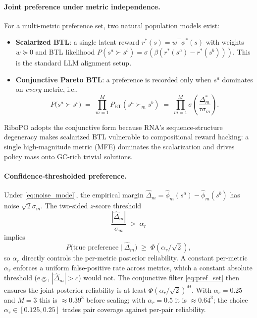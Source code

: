 {{\paragraph{Joint preference under metric independence.}
For a multi-metric preference set, two natural population models exist:
\begin{itemize}[leftmargin=1.2em,itemsep=2pt,topsep=2pt]
\item \textbf{Scalarized BTL}: a single latent reward $r^*(s) = w^\top \phi^*(s)$ with weights $w \succeq 0$ and BTL likelihood $P(s^a \succ s^b) = \sigma(\beta(r^*(s^a) - r^*(s^b)))$. This is the standard LLM alignment setup.
\item \textbf{Conjunctive Pareto BTL}: a preference is recorded only when $s^a$ dominates on \emph{every} metric, i.e.,
\begin{equation}
P\big(s^a \succ s^b\big) \;=\; \prod_{m=1}^M P_{\text{BT}}(s^a \succ_m s^b)
\;=\; \prod_{m=1}^M \sigma\!\left(\frac{\Delta_m^*}{\tau\sigma_m}\right).
\label{eq:conjunctive_bt}
\end{equation}
\end{itemize}
RiboPO adopts the conjunctive form because RNA's sequence-structure degeneracy makes scalarized BTL vulnerable to compositional reward hacking: a single high-magnitude metric (MFE) dominates the scalarization and drives policy mass onto GC-rich trivial solutions.

\paragraph{Confidence-thresholded preference.}
Under \eqref{eq:noise_model}, the empirical margin $\hat{\Delta}_m = \hat{\phi}_m(s^a) - \hat{\phi}_m(s^b)$ has noise $\sqrt{2}\sigma_m$. The two-sided $z$-score threshold
\begin{equation}
\frac{|\hat{\Delta}_m|}{\sigma_m} \;>\; \alpha_r
\label{eq:z_threshold}
\end{equation}
implies
\[
P\big(\text{true preference} \mid \hat{\Delta}_m\big) \;\geq\; \Phi(\alpha_r/\sqrt{2}),
\]
so $\alpha_r$ directly controls the per-metric posterior reliability. A constant per-metric $\alpha_r$ enforces a uniform false-positive rate across metrics, which a constant absolute threshold (e.g., $|\hat\Delta_m| > c$) would not. The conjunctive filter \eqref{eq:pref_set} then ensures the joint posterior reliability is at least $\Phi(\alpha_r/\sqrt{2})^M$. With $\alpha_r = 0.25$ and $M=3$ this is $\approx 0.39^3$ before scaling; with $\alpha_r=0.5$ it is $\approx 0.64^3$; the choice $\alpha_r \in [0.125, 0.25]$ trades pair coverage against per-pair reliability.

}}
